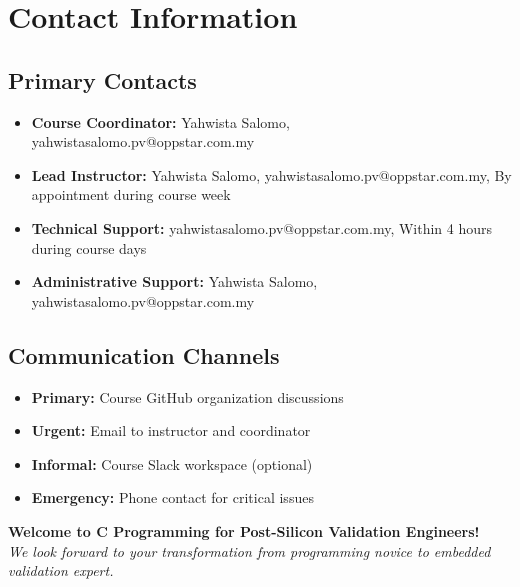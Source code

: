 \documentclass[11pt,a4paper]{article}
\begin{document}
\section{Contact Information}

\subsection{Primary Contacts}
\begin{itemize}
    \item \textbf{Course Coordinator:} Yahwista Salomo, yahwistasalomo.pv@oppstar.com.my
    \item \textbf{Lead Instructor:} Yahwista Salomo, yahwistasalomo.pv@oppstar.com.my, By appointment during course week
    \item \textbf{Technical Support:} yahwistasalomo.pv@oppstar.com.my, Within 4 hours during course days
    \item \textbf{Administrative Support:} Yahwista Salomo, yahwistasalomo.pv@oppstar.com.my
\end{itemize}

\subsection{Communication Channels}
\begin{itemize}
    \item \textbf{Primary:} Course GitHub organization discussions
    \item \textbf{Urgent:} Email to instructor and coordinator
    \item \textbf{Informal:} Course Slack workspace (optional)
    \item \textbf{Emergency:} Phone contact for critical issues
\end{itemize}

\vspace{1cm}

\begin{center}
\textbf{Welcome to C Programming for Post-Silicon Validation Engineers!}\\
\textit{We look forward to your transformation from programming novice to embedded validation expert.}
\end{center}
\end{document}
